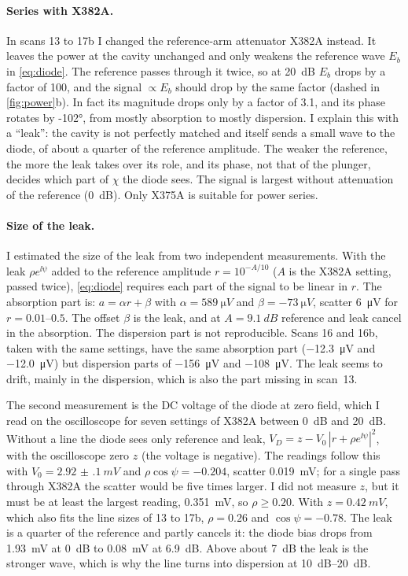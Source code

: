 \paragraph{Series with X382A.}
In scans 13 to 17b I changed the reference-arm attenuator X382A instead. It leaves the power at the cavity unchanged and only
weakens the reference wave $E_b$ in \cref{eq:diode}. The reference passes through it twice, so at \qty{20}{dB} $E_b$
drops by a factor of 100, and the signal $\propto E_b$ should drop by the same factor (dashed in \cref{fig:power}b).
In fact its magnitude drops only by a factor of 3.1, and its phase rotates by \ang{-102}, from mostly absorption to
mostly dispersion. I explain this with a \enquote{leak}: the cavity is not perfectly matched and itself sends a small
wave to the diode, of about a quarter of the reference amplitude. The weaker the reference, the more the leak takes over its role, and its
phase, not that of the plunger, decides which part of $\chi$ the diode sees. The signal is largest without attenuation
of the reference (\qty{0}{dB}). Only X375A is suitable for power series.

\paragraph{Size of the leak.}
I estimated the size of the leak from two independent measurements. With the leak $\rho e^{\ii\psi}$ added to the reference amplitude
$r=10^{-A/10}$ ($A$ is the X382A setting, passed twice), \cref{eq:diode} requires each part of the signal to be linear
in $r$. The absorption part is: $a=\alpha r+\beta$ with $\alpha=\qty{589}{\micro V}$ and $\beta=\qty{-73}{\micro V}$,
scatter \qty{6}{\micro V} for $r=\numrange{0.01}{0.5}$. The offset $\beta$ is the leak, and at $A=\qty{9.1}{dB}$ reference
and leak cancel in the absorption. The dispersion part is not reproducible. Scans 16 and 16b, taken with the same
settings, have the same absorption part (\qty{-12.3}{\micro V} and \qty{-12.0}{\micro V}) but dispersion parts of
\qty{-156}{\micro V} and \qty{-108}{\micro V}. The leak seems to drift, mainly in the dispersion, which is also the part
missing in scan~13.

The second measurement is the DC voltage of the diode at zero field, which I read on the oscilloscope for seven settings
of X382A between \qty{0}{dB} and \qty{20}{dB}. Without a line the diode sees only reference and leak,
$V_D=z-V_0\,|r+\rho e^{\ii\psi}|^2$, with the oscilloscope zero $z$ (the voltage is negative). The readings follow this
with $V_0=\qty{2.92(10)}{mV}$ and $\rho\cos\psi=\num{-0.204}$, scatter \qty{0.019}{mV}; for a single pass through X382A
the scatter would be five times larger. I did not measure $z$, but it must be at least the largest reading,
\qty{0.351}{mV}, so $\rho\geq\num{0.20}$. With $z=\qty{0.42}{mV}$, which also fits the line sizes of 13 to 17b,
$\rho=\num{0.26}$ and $\cos\psi=\num{-0.78}$. The leak is a quarter of the reference and partly cancels it: the diode
bias drops from \qty{1.93}{mV} at \qty{0}{dB} to \qty{0.08}{mV} at \qty{6.9}{dB}. Above about \qty{7}{dB} the leak is the
stronger wave, which is why the line turns into dispersion at \qtyrange{10}{20}{dB}.

